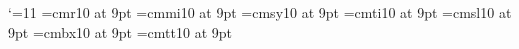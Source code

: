 


\pagewidth{29pc}
\raggedbottom
\tenpoint

\catcode`\@=11
\font@\ninerm=cmr10 at 9pt
\font@\ninei=cmmi10 at 9pt
\font@\ninesy=cmsy10 at 9pt
\font@\nineit=cmti10 at 9pt
\font@\ninesl=cmsl10 at 9pt
\font@\ninebf=cmbx10 at 9pt
\font@\ninett=cmtt10 at 9pt
\def\ninepoint{\normalbaselineskip12pt
 \def\rm{\fam0\ninerm}%
 \def\it{\fam\itfam\nineit}%
 \def\sl{\fam\slfam\ninesl}%
 \def\bf{\fam\bffam\ninebf}%
 \def\tt{\ninett}%
 \def\smc{\tensmc}%
 \textfont0=\ninerm   \scriptfont0=\sevenrm   \scriptscriptfont0=\fiverm
 \textfont1=\ninei    \scriptfont1=\seveni    \scriptscriptfont1=\fivei
 \textfont2=\ninesy   \scriptfont2=\sevensy   \scriptscriptfont2=\fivesy
 \textfont3=\tenex   \scriptfont3=\tenex     \scriptscriptfont3=\tenex
 \textfont\itfam=\nineit
 \textfont\slfam=\ninesl
 \textfont\bffam=\ninebf \scriptfont\bffam=\sevenbf
   \scriptscriptfont\bffam=\fivebf
 \tt\ttglue=.45em  minus .135em
 \setbox\strutbox=\hbox{\vrule height8pt depth3pt width0pt}%
 \normalbaselines\rm}

